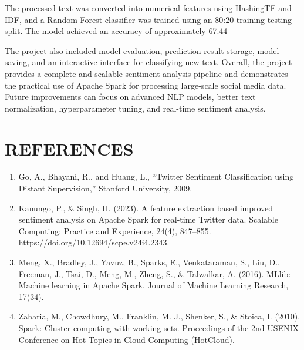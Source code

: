 \documentclass[12pt,a4paper]{article}
\begin{document}
The processed text was converted into numerical features using HashingTF and IDF, and a Random Forest classifier was trained using an 80:20 training-testing split. The model achieved an accuracy of approximately 67.44%

The project also included model evaluation, prediction result storage, model saving, and an interactive interface for classifying new text. Overall, the project provides a complete and scalable sentiment-analysis pipeline and demonstrates the practical use of Apache Spark for processing large-scale social media data. Future improvements can focus on advanced NLP models, better text normalization, hyperparameter tuning, and real-time sentiment analysis.

\newpage
\section{REFERENCES}

\begin{enumerate}

\item Go, A., Bhayani, R., and Huang, L., ``Twitter Sentiment Classification using Distant Supervision,'' Stanford University, 2009.

\item Kanungo, P., & Singh, H. (2023). A feature extraction based improved sentiment analysis on Apache Spark for real-time Twitter data. Scalable Computing: Practice and Experience, 24(4), 847–855. https://doi.org/10.12694/scpe.v24i4.2343.

\item Meng, X., Bradley, J., Yavuz, B., Sparks, E., Venkataraman, S., Liu, D., Freeman, J., Tsai, D., Meng, M., Zheng, S., & Talwalkar, A. (2016). MLlib: Machine learning in Apache Spark. Journal of Machine Learning Research, 17(34).

\item Zaharia, M., Chowdhury, M., Franklin, M. J., Shenker, S., & Stoica, I. (2010). Spark: Cluster computing with working sets. Proceedings of the 2nd USENIX Conference on Hot Topics in Cloud Computing (HotCloud).

\end{enumerate}

\end{document}
